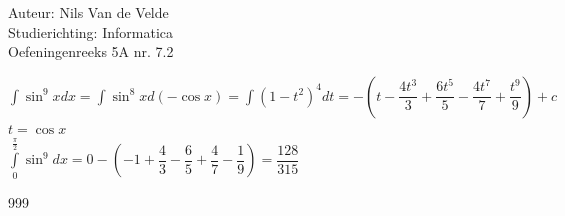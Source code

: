 \documentclass[a4paper]{article}
\begin{document}
\newcommand{\dint}{\displaystyle\int}
  
\noindent \large Auteur: Nils Van de Velde \\
\noindent \large Studierichting: Informatica\\
\noindent \large Oefeningenreeks 5A nr. 7.2\\

\medskip

\normalsize

$\dint\sin^9xdx=\dint\sin^8xd(-\cos x)=\dint(1-t^2)^4dt=-\left(t-\dfrac{4t^3}{3}+\dfrac{6t^5}{5}-\dfrac{4t^7}{7}+\dfrac{t^9}{9}\right)+c$\\

$t = \cos x$\\

$\dint\limits_0^{\tfrac{\pi}{2}}\sin^9dx=0-\left(-1+\dfrac{4}{3}-\dfrac{6}{5}+\dfrac{4}{7}-\dfrac{1}{9}\right)=\dfrac{128}{315}$\\

\begin{thebibliography}{999}
\end{thebibliography}
\end{document}
